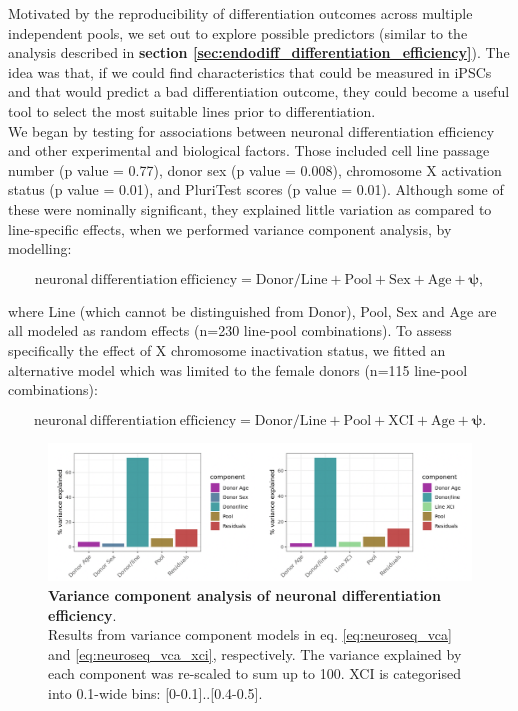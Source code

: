 Motivated by the reproducibility of differentiation outcomes across multiple independent pools, we set out to explore possible predictors (similar to the analysis described in \textbf{section \ref{sec:endodiff_differentiation_efficiency}}).
The idea was that, if we could find characteristics that could be measured in iPSCs and that would predict 
a bad differentiation outcome, they could become a 
useful tool to select the most suitable lines prior to differentiation. \\

We began by testing for associations between neuronal differentiation efficiency and other experimental and biological factors.
Those included cell line passage number (p value = 0.77), donor sex (p value = 0.008), chromosome X activation status (p value = 0.01), and PluriTest scores \cite{muller2011bioinformatic} (p value = 0.01).
Although some of these were nominally significant, they explained little variation as compared to line-specific effects, when we performed variance component analysis, by modelling:

\begin{equation}\label{eq:neuroseq_vca}
    \mathrm{neuronal \ differentiation \ efficiency = Donor/Line + Pool + Sex + Age + \boldsymbol{\psi}},
\end{equation}

where Line (which cannot be distinguished from Donor), Pool, Sex and Age are all modeled as random effects (n=230 line-pool combinations).
To assess specifically the effect of X chromosome inactivation status, we fitted an alternative model which was limited to the female donors (n=115 line-pool combinations):

\begin{equation}\label{eq:neuroseq_vca_xci}
    \mathrm{neuronal \ differentiation \ efficiency = Donor/Line + Pool + XCI + Age + \boldsymbol{\psi}}. 
\end{equation}

\begin{figure}[htbp]
\centering
\includegraphics[width=16cm]{Chapter5/Fig/neuroseq_diff_eff_vca.png}
\caption[Variance component analysis of neuronal differentiation efficiency]{\textbf{Variance component analysis of neuronal differentiation efficiency}.\\
Results from variance component models in eq. \eqref{eq:neuroseq_vca} and \eqref{eq:neuroseq_vca_xci}, respectively.
The variance explained by each component was re-scaled to sum up to 100.
XCI is categorised into 0.1-wide bins: [0-0.1]..[0.4-0.5].}
\label{fig:neuroseq_diff_eff_vca}
\end{figure}

